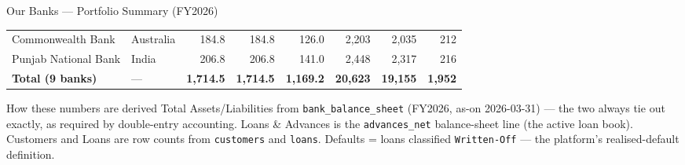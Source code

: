 \documentclass[9pt,aspectratio=169]{beamer}
\begin{document}
\begin{frame}{Our Banks --- Portfolio Summary (FY2026)}
\begin{center}
\begin{tabular}{lp{2.1cm}rrrrrr}
  Commonwealth Bank       & Australia       & 184.8 & 184.8 & 126.0 & 2{,}203 & 2{,}035 & 212\\
  Punjab National Bank   & India           & 206.8 & 206.8 & 141.0 & 2{,}448 & 2{,}317 & 216\\
  \midrule
  \textbf{Total (9 banks)} & --- & \textbf{1{,}714.5} & \textbf{1{,}714.5} & \textbf{1{,}169.2} & \textbf{20{,}623} & \textbf{19{,}155} & \textbf{1{,}952}\\
  \bottomrule
\end{tabular}
\end{center}
\vspace{6pt}
\begin{alertblock}{How these numbers are derived}
  \footnotesize
  Total Assets/Liabilities from \texttt{bank\_balance\_sheet} (FY2026, as-on 2026-03-31) --- the two
  always tie out exactly, as required by double-entry accounting. Loans \& Advances is the
  \texttt{advances\_net} balance-sheet line (the active loan book). Customers and Loans are row
  counts from \texttt{customers} and \texttt{loans}. Defaults = loans classified
  \texttt{Written-Off} --- the platform's realised-default definition.
\end{alertblock}
\end{frame}
\end{document}
